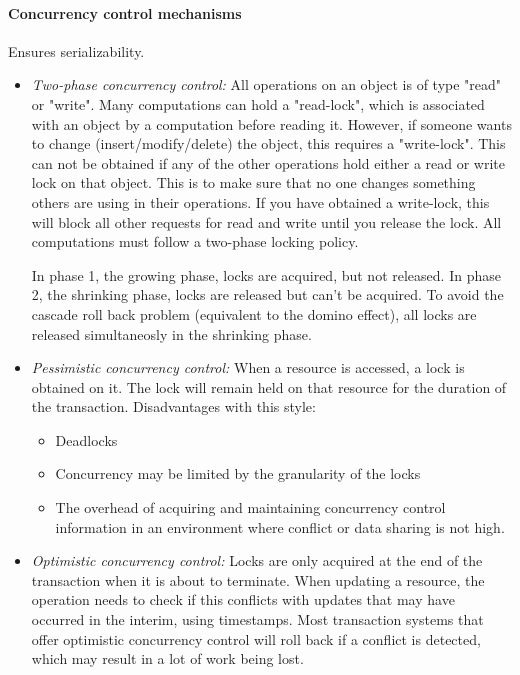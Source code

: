 \paragraph{Concurrency control mechanisms} Ensures serializability.

\begin{itemize}%
  \item \textit{Two-phase concurrency control:} All operations on an object is of type "read" or "write". Many computations can hold a "read-lock", which is associated with an object by a computation before reading it. However, if someone wants to change (insert/modify/delete) the object, this requires a "write-lock". This can not be obtained if any of the other operations hold either a read or write lock on that object. This is to make sure that no one changes something others are using in their operations. If you have obtained a write-lock, this will block all other requests for read and write until you release the lock. All computations must follow a two-phase locking policy.

  In phase 1, the growing phase, locks are acquired, but not released. In phase 2, the shrinking phase, locks are released but can't be acquired. To avoid the cascade roll back problem (equivalent to the domino effect), all locks are released simultaneosly in the shrinking phase.

  \item \textit{Pessimistic concurrency control:} When a resource is accessed, a lock is obtained on it. The lock will remain held on that resource for the duration of the transaction. Disadvantages with this style:
  \begin{itemize}[nolistsep,noitemsep]
    \item Deadlocks
    \item Concurrency may be limited by the granularity of the locks
    \item The overhead of acquiring and maintaining concurrency control information in an environment where conflict or data sharing is not high.
  \end{itemize}

  \item \textit{Optimistic concurrency control:} Locks are only acquired at the end of the transaction when it is about to terminate. When updating a resource, the operation needs to check if this conflicts with updates that may have occurred in the interim, using timestamps. Most transaction systems that offer optimistic concurrency control will roll back if a conflict is detected, which may result in a lot of work being lost.


\end{itemize}
